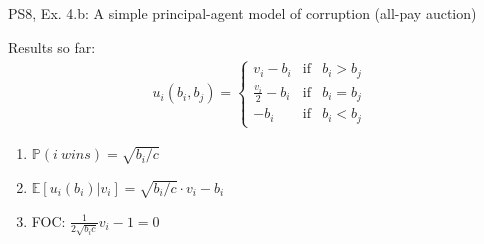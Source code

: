 \begin{frame}{PS8, Ex. 4.b: A simple principal-agent model of corruption (all-pay auction)}
\begin{multicols}{2}
      Results so far: \vspace{-6pt}
      \begin{align*}
        u_i(b_i,b_j)=\left\{\begin{array}{lcl}
          v_i-b_i           & \text{if} & b_i>b_j \\
          \frac{v_i}{2}-b_i & \text{if} & b_i=b_j \\
          -b_i              & \text{if} & b_i<b_j
        \end{array}\right.
      \end{align*} \vspace{-16pt}
      \begin{enumerate}
        \item $\mathbb{P}(i\ wins)=\sqrt{b_i/c}$
        \item $\mathbb{E}[u_i(b_i)|v_i]=\sqrt{b_i/c}\cdot v_i-b_i$
        \item FOC: $\frac{1}{2\sqrt{b_ic}}v_i-1=0$
      \end{enumerate}
      \vfill\null
    \end{multicols}
\end{frame}
